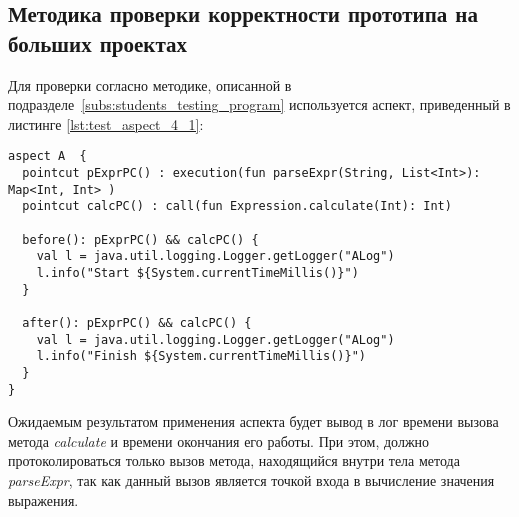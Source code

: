 \subsection{Методика проверки корректности прототипа на больших проектах}
\label{sub:students_programm_methodology}
Для проверки согласно методике, описанной в подразделе~\ref{subs:students_testing_program} используется аспект, приведенный в листинге \ref{lst:test_aspect_4_1}:
\begin{lstlisting}[style={java}, label={lst:test_aspect_4_1},
  caption={Пример тестового аспекта}]
aspect A  {
  pointcut pExprPC() : execution(fun parseExpr(String, List<Int>): Map<Int, Int> )
  pointcut calcPC() : call(fun Expression.calculate(Int): Int)

  before(): pExprPC() && calcPC() {
    val l = java.util.logging.Logger.getLogger("ALog")
    l.info("Start ${System.currentTimeMillis()}")
  }

  after(): pExprPC() && calcPC() {
    val l = java.util.logging.Logger.getLogger("ALog")
    l.info("Finish ${System.currentTimeMillis()}")
  }
}
\end{lstlisting}
Ожидаемым результатом применения аспекта будет вывод в лог времени вызова метода \textit{calculate} и времени окончания его работы.
При этом, должно протоколироваться только вызов метода, находящийся внутри тела метода \textit{parseExpr}, так как данный вызов является точкой входа в вычисление значения выражения.



